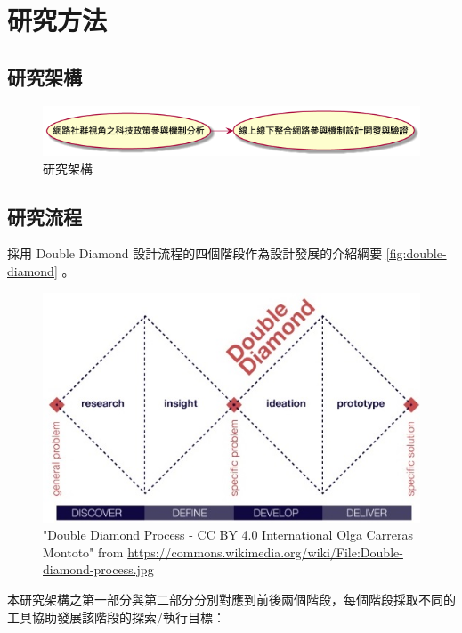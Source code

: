 \documentclass[12pt,a4paper]{article}
\begin{document}
\section{研究方法 }
\label{sec:orgba46742}
\subsection{研究架構}
\label{sec:orgedd79eb}
\begin{figure}[htbp]
\centering
\includegraphics[width=.9\linewidth]{./images/research_arch.png}
\caption{\label{fig:org71bb966}
研究架構}
\end{figure}

\subsection{研究流程}
\label{sec:org173c4f2}
採用 Double Diamond \cite{double_diamond} 設計流程的四個階段作為設計發展的介紹綱要 \ref{fig:double-diamond} 。

\begin{figure}[htbp]
\centering
\includegraphics[width=.9\linewidth]{./images/Double-diamond-process.jpg}
\caption{\label{fig:orgac1a38f}
"Double Diamond Process - CC BY 4.0 International Olga Carreras Montoto" from \url{https://commons.wikimedia.org/wiki/File:Double-diamond-process.jpg}}
\end{figure}

本研究架構之第一部分與第二部分分別對應到前後兩個階段，每個階段採取不同的工具協助發展該階段的探索/執行目標：
\end{document}
